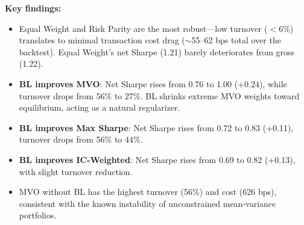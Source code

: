 \documentclass[12pt,a4paper]{article}
\begin{document}
\begin{table}[H]
\centering
\caption{Rolling Backtest Performance (Net of Transaction Costs)}
\label{tab:backtest}
\end{table}

\textbf{Key findings:}
\begin{itemize}[noitemsep]
    \item Equal Weight and Risk Parity are the most robust---low turnover ($< 6\%$) translates to minimal transaction cost drag ($\sim$55--62 bps total over the backtest). Equal Weight's net Sharpe (1.21) barely deteriorates from gross (1.22).
    \item \textbf{BL improves MVO}: Net Sharpe rises from 0.76 to 1.00 (+0.24), while turnover drops from 56\% to 27\%. BL shrinks extreme MVO weights toward equilibrium, acting as a natural regularizer.
    \item \textbf{BL improves Max Sharpe}: Net Sharpe rises from 0.72 to 0.83 (+0.11), turnover drops from 56\% to 44\%.
    \item \textbf{BL improves IC-Weighted}: Net Sharpe rises from 0.69 to 0.82 (+0.13), with slight turnover reduction.
    \item MVO without BL has the highest turnover (56\%) and cost (626 bps), consistent with the known instability of unconstrained mean-variance portfolios.
\end{itemize}
\end{document}
